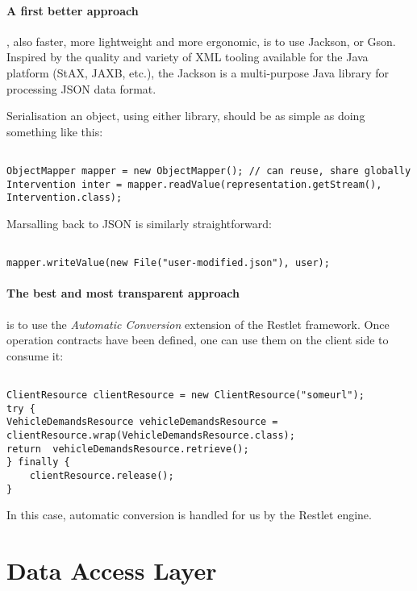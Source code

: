 \documentclass[12pt]{scrartcl}
\begin{document}
\paragraph{A first better approach}, also faster, more lightweight and more ergonomic, is to use Jackson, or Gson. Inspired by the quality and variety of XML tooling available for the Java platform (StAX, JAXB, etc.), the Jackson is a multi-purpose Java library for processing JSON data format.

Serialisation an object, using either library, should be as simple as doing something like this:

\begin{lstlisting}

ObjectMapper mapper = new ObjectMapper(); // can reuse, share globally
Intervention inter = mapper.readValue(representation.getStream(), Intervention.class);

\end{lstlisting}

Marsalling back to JSON is similarly straightforward:

\begin{lstlisting}

mapper.writeValue(new File("user-modified.json"), user);

\end{lstlisting}

\paragraph{The best and most transparent approach} is to use the \emph{Automatic Conversion} extension of the Restlet framework. Once operation contracts have been defined, one can use them on the client side to consume it:

\begin{lstlisting}

ClientResource clientResource = new ClientResource("someurl");
try {
VehicleDemandsResource vehicleDemandsResource = clientResource.wrap(VehicleDemandsResource.class);
return  vehicleDemandsResource.retrieve();
} finally {
    clientResource.release();
}

\end{lstlisting}

In this case, automatic conversion is handled for us by the Restlet engine.

\section{Data Access Layer}
\end{document}
